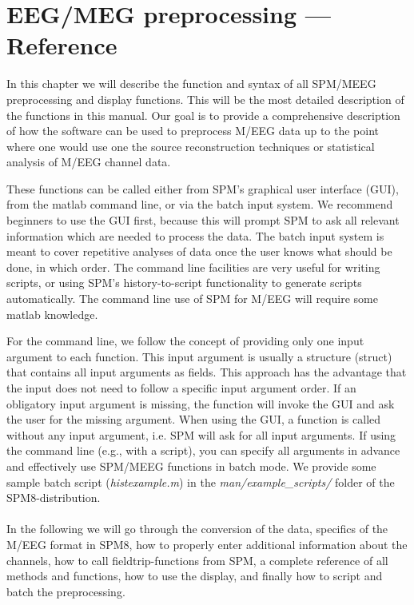 \chapter{EEG/MEG preprocessing --- Reference
  \label{Chap:eeg:preprocessing}} 

In this chapter we will describe the function and syntax of all 
SPM/MEEG preprocessing and display functions. This will be the most
detailed description of the functions in this
manual. Our goal is to provide a comprehensive description of how the
software can be used to preprocess M/EEG data up to the point where
one would use one the source reconstruction techniques or statistical
analysis of M/EEG channel data. 

These functions can be called either from SPM's graphical user
interface (GUI), from the matlab command line, or via the batch input
system. We recommend beginners to use the GUI first, because this will
prompt SPM to ask all relevant information which are needed to process
the data. The batch input system is meant to cover repetitive analyses
of data once the user knows what should be done, in which order. The
command line facilities are very useful for writing scripts, or using
SPM's history-to-script functionality to generate scripts
automatically. The command line use of SPM for M/EEG will require some
matlab knowledge.

For the command line, we follow the concept of providing only one
input argument to each function. This input argument is usually a 
structure (struct) that contains all input arguments as fields. This
approach has the advantage that the input does not need to follow a
specific input argument order. If an obligatory input argument is
missing, the function will invoke the GUI and ask the user for the
missing argument. When using the GUI, a function is called without any
input argument, i.e. SPM will ask for all input arguments. If using
the command line (e.g., with a script), you can specify all arguments
in advance and effectively use SPM/MEEG functions in batch mode. We
provide some sample batch script (\textit{histexample.m}) in the
\textit{man/example\_scripts/} folder of the SPM8-distribution.
\\
\\
In the following we will go through the conversion of the data, specifics of the M/EEG format in SPM8, how to properly enter additional information about the channels, how to call fieldtrip-functions from SPM, a complete reference of all methods and functions, how to use the display, and finally how to script and batch the preprocessing.

